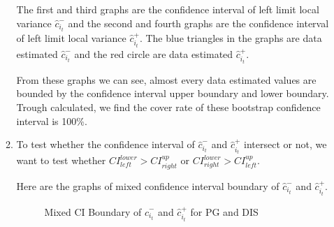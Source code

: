 \documentclass[12pt,letterpaper]{article}
\begin{document}
\begin{enumerate}[label=\textbf{(\Alph*)}]
\begin{enumerate}[label=(\roman*)]
  The first and third graphs are the confidence interval of left limit local variance $\hat{c}_{i_t}^-$ and the second and fourth  graphs are the confidence interval of left limit local variance $\hat{c}_{i_t}^+$. The blue triangles in the graphs are data estimated $\hat{c}_{i_t}^-$ and the red circle are data estimated $\hat{c}_{i_t}^+$.

  From these graphs we can see, almost every data estimated values are bounded by the confidence interval upper boundary and lower boundary. Trough calculated, we find the cover rate of these bootstrap confidence interval is 100\%. 

\item To test whether the confidence interval of $\hat{c}_{i_t}^-$ and $\hat{c}_{i_t}^+$ intersect or not, we want to test whether  $CI_{left}^{lower} > CI_{right}^{up}$ or $CI_{right}^{lower} > CI_{left}^{up}$. 

Here are the graphs of mixed confidence interval boundary of $\hat{c}_{i_t}^-$ and $\hat{c}_{i_t}^+$.
 \begin{figure}[H]
	\centering
	\caption{ Mixed CI Boundary of $\hat{c}_{i_t}^-$ and $\hat{c}_{i_t}^+$ for PG and DIS}
\end{figure}


\end{enumerate}
\end{enumerate}
\end{document}
